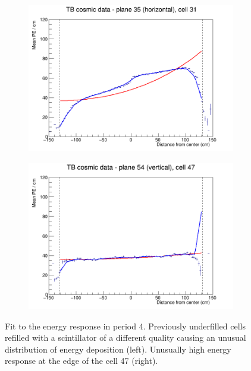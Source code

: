 \documentclass[12pt,a4paper]{article}
\begin{document}
\begin{figure}[h]
  \begin{subfigure}{0.5\textwidth}
    \includegraphics[width=\linewidth]{RelativeCalibrationResults/p4_035_031.png}
  \end{subfigure}
  \begin{subfigure}{0.5\textwidth}
    \includegraphics[width=\linewidth]{RelativeCalibrationResults/p4_054_047.png}
  \end{subfigure}
  \caption{Fit to the energy response in period 4. Previously underfilled cells refilled with a scintillator of a different quality causing an unusual distribution of energy deposition (left). Unusually high energy response at the edge of the cell 47 (right).}
  \label{figAttenfitResultsPeriod4}
\end{figure}
\end{document}
